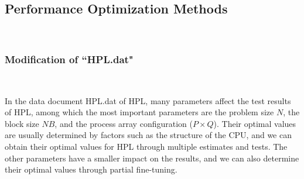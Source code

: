 \subsection{Performance Optimization Methods}
\ 

\subsubsection{Modification of ``HPL.dat"}
\ 

In the data document HPL.dat of HPL, many parameters affect the test results of HPL, among which the most important parameters are the problem size $N$, the block size $NB$, and the process array configuration ($P\times Q$). 
Their optimal values are usually determined by factors such as
the structure of the CPU, and we can obtain their optimal values for HPL through multiple estimates and tests. 
The other parameters have a smaller impact on the results, and we can also determine their optimal values through partial fine-tuning.

